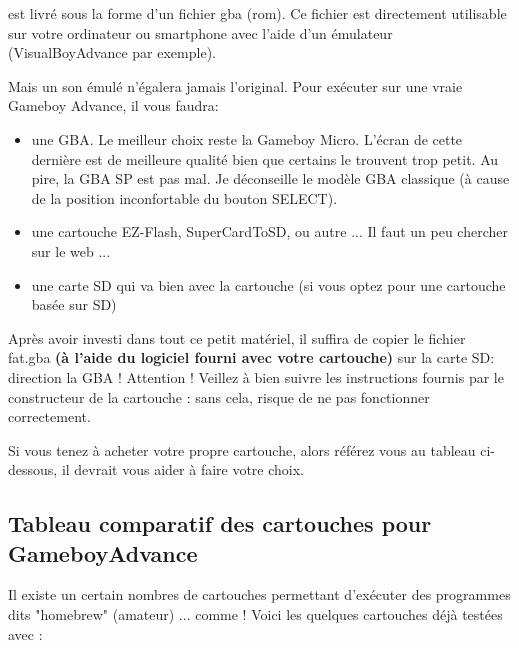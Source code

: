 \FAT est livré sous la forme d'un fichier gba (rom).
Ce fichier est directement utilisable sur votre ordinateur ou smartphone avec l'aide d'un émulateur (VisualBoyAdvance par exemple).
\medskip

Mais un son émulé n'égalera jamais l'original.
Pour exécuter \FAT sur une vraie Gameboy Advance, il vous faudra:
\begin{itemize}
  \item{une GBA. Le meilleur choix reste la Gameboy Micro. L'écran de cette dernière est de meilleure qualité bien que certains le trouvent trop petit. Au pire, la GBA SP est pas mal. Je déconseille le modèle GBA classique (à cause de la position inconfortable du bouton SELECT).}
  \item{une cartouche EZ-Flash, SuperCardToSD, ou autre ... Il faut un peu chercher sur le web ...}
  \item{une carte SD qui va bien avec la cartouche (si vous optez pour une cartouche basée sur SD)}
\end{itemize}\medskip

Après avoir investi dans tout ce petit matériel, il suffira de copier le fichier fat.gba {\bf (à l'aide du logiciel fourni avec votre cartouche)} sur la carte SD: direction la GBA !
Attention ! Veillez à bien suivre les instructions fournis par le constructeur de la cartouche : sans cela, \FAT risque de ne pas fonctionner correctement.


Si vous tenez à acheter votre propre cartouche, alors référez vous au tableau ci-dessous, il devrait vous aider à faire votre choix.

\subsection{Tableau comparatif des cartouches pour GameboyAdvance}

Il existe un certain nombres de cartouches permettant d'exécuter des programmes dits "homebrew" (amateur) ... comme \FAT !
Voici les quelques cartouches déjà testées avec \FAT :
\medskip

